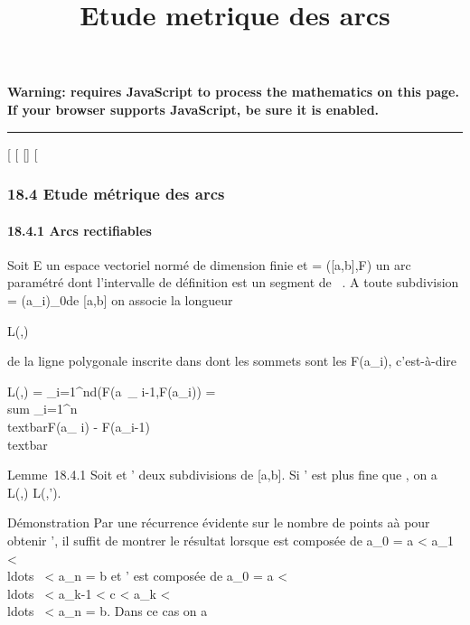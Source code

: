 \documentclass[]{article}
\title{Etude metrique des arcs}
\author{}
\date{}
\begin{document}
\maketitle

\textbf{Warning: 
requires JavaScript to process the mathematics on this page.\\ If your
browser supports JavaScript, be sure it is enabled.}

\begin{center}\rule{3in}{0.4pt}\end{center}

{[}
{[}
{[}{]}
{[}

\subsubsection{18.4 Etude métrique des arcs}

\paragraph{18.4.1 Arcs rectifiables}

Soit E un espace vectoriel normé de dimension finie et \Gamma = ({[}a,b{]},F)
un arc paramétré dont l'intervalle de définition est un segment de ~. A
toute subdivision \sigma = (a\_i)\_0\leqi\leqn de {[}a,b{]} on
associe la longueur

L(\Gamma,\sigma)

de la ligne polygonale inscrite dans \Gamma dont les sommets sont les
F(a\_i), c'est-à-dire

L(\Gamma,\sigma) = \sum \_i=1^nd(F(a~\_
i-1,F(a\_i)) = \\sum
\_i=1^n\\textbar{}F(a\_ i) -
F(a\_i-1)\\textbar{}

Lemme~18.4.1 Soit \sigma et \sigma' deux subdivisions de {[}a,b{]}. Si \sigma' est plus
fine que \sigma, on a L(\Gamma,\sigma) \leq L(\Gamma,\sigma').

Démonstration Par une récurrence évidente sur le nombre de points
a à \sigma pour obtenir \sigma', il suffit de montrer le résultat lorsque \sigma
est composée de a\_0 = a \textless{} a\_1 \textless{}
\\ldots~ \textless{}
a\_n = b et \sigma' est composée de a\_0 = a \textless{}
\\ldots~ \textless{}
a\_k-1 \textless{} c \textless{} a\_k \textless{}
\\ldots~ \textless{}
a\_n = b. Dans ce cas on a
\end{document}
